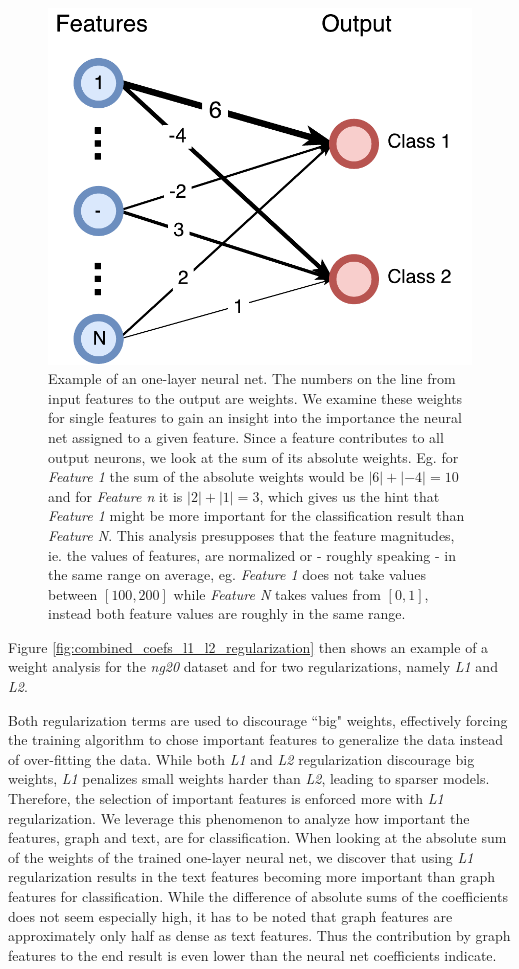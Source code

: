 \begin{figure}[htb!]
	\centering
	{\includegraphics[width=0.5\linewidth]{assets/figures/coefs_example.pdf}%
		\caption[Example: One-layer neural net]{%
			Example of an one-layer neural net. The numbers on the line from input features to the output are weights.
			We examine these weights for single features to gain an insight into the importance the neural net assigned to a given feature. Since a feature contributes to all output neurons, we look at the sum of its absolute weights. Eg. for \textit{Feature 1} the sum of the absolute weights would be $|6| + |-4| = 10$ and for \textit{Feature n} it is $|2| + |1| = 3$, which gives us the hint that \textit{Feature 1} might be more important for the classification result than \textit{Feature N}.
			This analysis presupposes that the feature magnitudes, ie. the values of features, are normalized or - roughly speaking - in the same range on average, eg. \textit{Feature 1} does not take values between $[100, 200]$ while \textit{Feature N} takes values from $[0, 1]$, instead both feature values are roughly in the same range.
		}%
		\label{fig:coefs_example_one_layer}}
\end{figure}

Figure \ref{fig:combined_coefs_l1_l2_regularization} then shows an example of a weight analysis for the \textit{ng20} dataset and for two regularizations, namely \textit{L1} and \textit{L2}.

Both regularization terms are used to discourage ``big" weights, effectively forcing the training algorithm to chose important features to generalize the data instead of over-fitting the data.
While both \textit{L1} and \textit{L2} regularization discourage big weights, \textit{L1} penalizes small weights harder than \textit{L2}, leading to sparser models.
Therefore, the selection of important features is enforced more with \textit{L1} regularization.
We leverage this phenomenon to analyze how important the features, graph and text, are for classification.
When looking at the absolute sum of the weights of the trained one-layer neural net, we discover that using \textit{L1} regularization results in the text features becoming more important than graph features for classification.
While the difference of absolute sums of the coefficients does not seem especially high, it has to be noted that graph features are approximately only half as dense as text features.
Thus the contribution by graph features to the end result is even lower than the neural net coefficients indicate.

